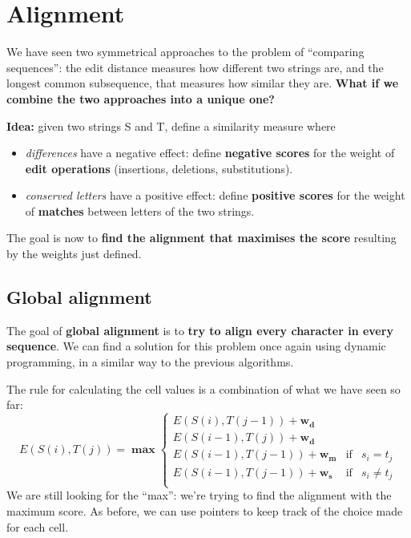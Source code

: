 \documentclass[../main.tex]{subfiles}
\begin{document}
\section{Alignment}

We have seen two symmetrical approaches to the problem of ``comparing sequences'': the edit distance measures how different two strings are, and the longest common subsequence, that measures how similar they are.
\textbf{What if we combine the two approaches into a unique one?}

\textbf{Idea:} given two strings S and T, define a similarity measure where
\begin{itemize}
\item \emph{differences} have a negative effect: define \textbf{negative scores} for the weight of \textbf{edit operations} (insertions, deletions, substitutions).
\item \emph{conserved letters} have a positive effect: define \textbf{positive scores} for the weight of \textbf{matches} between letters of the two strings.
\end{itemize}

The goal is now to \textbf{find the alignment that maximises the score} resulting by the weights just defined.

\subsection{Global alignment}

The goal of \textbf{global alignment} is to \textbf{try to align every character in every sequence}. We can find a solution for this problem once again using dynamic programming, in a similar way to the previous algorithms.

The rule for calculating the cell values is a combination of what we have seen so far:
$$
E(S(i), T(j)) = \bm{\max} \left\{\begin{array}{rcl}
E(S(i), T(j-1)) + \mathbf{w_d} \\ 
E(S(i-1), T(j)) + \mathbf{w_d} \\
E(S(i-1), T(j-1)) + \mathbf{w_m} & \mbox{if} & s_i = t_j \\
E(S(i-1), T(j-1)) + \mathbf{w_s} & \mbox{if} & s_i \neq t_j \\
\end{array}
\right.
$$
We are still looking for the ``max'': we're trying to find the alignment with the maximum score.
As before, we can use pointers to keep track of the choice made for each cell.
\end{document}
